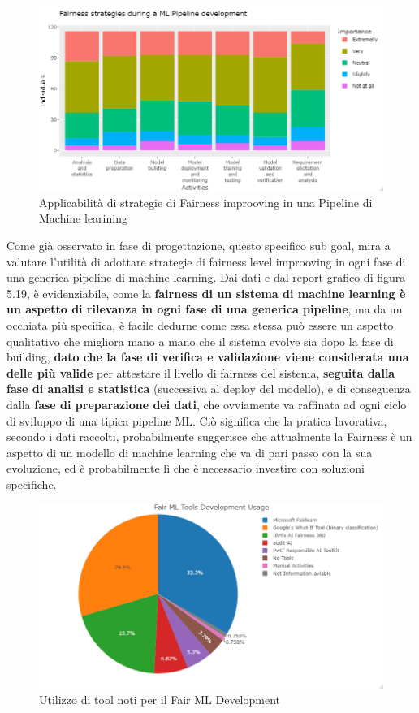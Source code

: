      \begin{figure}[h!]
        \centering
        \includegraphics[width=1\textwidth]{figure/Analisi/RQ4/Fairness strategies during a ML Pipeline development.png}
        \caption{Applicabilità di strategie di Fairness improoving in una Pipeline di Machine learining}
    \end{figure}
    Come già osservato in fase di progettazione, questo specifico sub goal, mira a valutare l'utilità di adottare strategie di fairness level improoving in ogni fase di una generica pipeline di machine learning. Dai dati e dal report grafico di figura 5.19, è  evidenziabile, come la \textbf{fairness di un sistema di machine learning è un aspetto di rilevanza in ogni fase di una generica pipeline}, ma da un occhiata più specifica, è facile dedurne come essa stessa può essere un aspetto qualitativo che migliora mano a mano che il sistema evolve sia dopo la fase di building, \textbf{dato che la fase di verifica e validazione viene considerata una delle più valide} per attestare il livello di fairness del sistema, \textbf{seguita dalla fase di analisi e statistica} (successiva al deploy del modello), e di conseguenza dalla \textbf{fase di preparazione dei dati}, che ovviamente va raffinata ad ogni ciclo di sviluppo di una tipica pipeline ML. Ciò significa che la pratica lavorativa, secondo i dati raccolti, probabilmente suggerisce che attualmente la Fairness è un aspetto di un modello di machine learning che va di pari passo con la sua evoluzione, ed è probabilmente lì che è necessario investire con soluzioni specifiche.
    
    \begin{figure}[h!]
        \centering
        \includegraphics[width=1\textwidth]{figure/Analisi/RQ4/Fair ML Tools Development Usage.png}
        \caption{Utilizzo di tool noti per il Fair ML Development}
    \end{figure}
    
